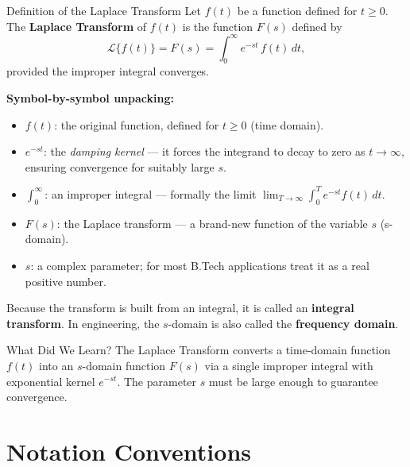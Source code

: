 \documentclass[12pt,a4paper]{article}
\begin{document}
\begin{infobox}{Definition of the Laplace Transform}
Let $f(t)$ be a function defined for $t \geq 0$. The \textbf{Laplace
Transform} of $f(t)$ is the function $F(s)$ defined by
\[
  \mathcal{L}\{f(t)\} = F(s) = \int_0^\infty e^{-st}\, f(t)\, dt,
\]
provided the improper integral converges.

\medskip
\noindent\textbf{Symbol-by-symbol unpacking:}
\begin{itemize}[leftmargin=1.5cm]
  \item $f(t)$: the original function, defined for $t \geq 0$ (time domain).
  \item $e^{-st}$: the \emph{damping kernel} --- it forces the integrand to
        decay to zero as $t \to \infty$, ensuring convergence for suitably
        large $s$.
  \item $\int_0^\infty$: an improper integral --- formally the limit
        $\lim_{T \to \infty} \int_0^T e^{-st} f(t)\, dt$.
  \item $F(s)$: the Laplace transform --- a brand-new function of the variable
        $s$ (s-domain).
  \item $s$: a complex parameter; for most B.Tech applications treat it as a
        real positive number.
\end{itemize}

\medskip
Because the transform is built from an integral, it is called an
\textbf{integral transform}. In engineering, the $s$-domain is also called the
\textbf{frequency domain}.
\end{infobox}

\begin{learnbox}{What Did We Learn?}
The Laplace Transform converts a time-domain function $f(t)$ into an
$s$-domain function $F(s)$ via a single improper integral with exponential
kernel $e^{-st}$. The parameter $s$ must be large enough to guarantee
convergence.
\end{learnbox}

\section{Notation Conventions}
\end{document}
